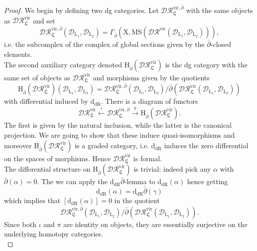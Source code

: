 \documentclass{article}
\theoremstyle{plain}
\theoremstyle{definition}
\theoremstyle{remark}
\newcommand{\mr}{\mathrm}
\newcommand{\MS}{\mr{MS}}
\newcommand{\3}{\vspace{3mm}}
\newcommand{\2}{\vspace{2mm}}
\newcommand{\1}{\vspace{1mm}}
\begin{document}
\begin{proof}
We begin by defining two dg categories. Let $\mathcal{DR}_\mathfrak{L}^{\mr{vir},\bar{\partial}}$ with the same objects as $\mathcal{DR}^{\mr{vir}}_{\mathfrak{L}}$ and set $$\mathcal{DR}_\mathfrak{L}^{\mr{vir},\bar{\partial}}\left(\mathscr{D}_{\mr{L}_1},\mathscr{D}_{\mr{L}_2}\right) = \Gamma_{\bar{\partial}}\left(\mr{X},\MS\left(\mathscr{DR}^{\mr{vir}}\left(\mathscr{D}_{\mr{L}_1},\mathscr{D}_{\mr{L}_2}\right)\right)\right),$$ i.e. the subcomplex of the complex of global sections given by the $\bar{\partial}$-closed elements.\\
The second auxiliary category denoted $\mr{H}_{\bar{\partial}}\left(\mathcal{DR}^{\mr{vir}}_\mathfrak{L}\right)$ is the dg category with the same set of objects as $\mathcal{DR}^{\mr{vir}}_\mathfrak{L}$ and morphisms given by the quotients $$\mr{H}_{\bar{\partial}}(\mathcal{DR}^{\mr{vir}}_\mathfrak{L})\left(\mathscr{D}_{\mr{L}_1},\mathscr{D}_{\mr{L}_2}\right) = \mathcal{DR}_\mathfrak{L}^{\mr{vir},\bar{\partial}}\left(\mathscr{D}_{\mr{L}_1},\mathscr{D}_{\mr{L}_2}\right)/\bar{\partial}\left(\mathcal{DR}^{\mr{vir}}_\mathfrak{L}\left(\mathscr{D}_{\mr{L}_1},\mathscr{D}_{\mr{L}_2}\right)\right)$$ with differential induced by $\mr{d_{dR}}$.
There is a diagram of functors $$\mathcal{DR}^{\mr{vir}}_\mathfrak{L} \overset{\iota}\longleftarrow \mathcal{DR}_\mathfrak{L}^{\mr{vir},\bar{\partial}} \overset{\pi}\longrightarrow \mr{H}_{\bar{\partial}}(\mathcal{DR}^{\mr{vir}}_\mathfrak{L}).$$ The first is given by the natural inclusion, while the latter is the canonical projection. We are going to show that these induce quasi-isomorphisms and moreover $\mr{H}_{\bar{\partial}}(\mathcal{DR}^{\mr{vir}}_\mathfrak{L})$ is a graded category, i.e. $\mr{d_{dR}}$ induces the zero differential on the spaces of morphisms. Hence $\mathcal{DR}^{\mr{vir}}_\mathfrak{L}$ is formal.\\
The differential structure on $\mr{H}_{\bar{\partial}}	\left(\mathcal{DR}^{\mr{vir}}_\mathfrak{L}\right)$ is trivial: indeed pick any $\alpha$ with $\bar{\partial}(\alpha)=0$. The we can apply the $\mr{d_{dR}}\bar{\partial}$-lemma to $\mr{d_{dR}}(\alpha)$ hence getting $$\mr{d_{dR}}(\alpha)=\mr{d_{dR}}\bar{\partial}(\gamma)$$ which implies that $[\mr{d_{dR}}(\alpha)]=0$ in the quotient $$\mathcal{DR}_\mathfrak{L}^{\mr{vir},\bar{\partial}}\left(\mathscr{D}_{\mr{L}_1},\mathscr{D}_{\mr{L}_2}\right)/\bar{\partial}\left(\mathcal{DR}^{\mr{vir}}_\mathfrak{L}\left(\mathscr{D}_{\mr{L}_1},\mathscr{D}_{\mr{L}_2}\right)\right).$$
Since both $\iota$ and $\pi$ are identity on objects, they are essentially surjective on the underlying homotopy categories.\\

\end{proof}
\end{document}
